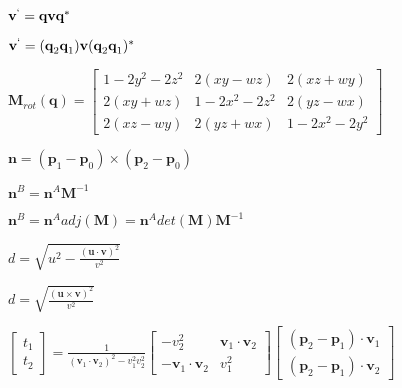 \documentclass{article}
\def\lthtmlcheckvsize{\ifdim\ht\sizebox<\vsize 
  \ifdim\wd\sizebox<\hsize\expandafter\hfill\fi \expandafter\vfill
  \else\expandafter\vss\fi}%
\begin{document}
{\newpage\clearpage
{}%
$ \textbf{v}^\lq = \textbf{q} \textbf{v} \textbf{q}^*$%
\lthtmlindisplaymathZ
\lthtmlcheckvsize\clearpage}

{\newpage\clearpage
{}%
$ \textbf{v}^\lq = (\textbf{q}_2\textbf{q}_1)\textbf{v}(\textbf{q}_2\textbf{q}_1)^*$%
\lthtmlindisplaymathZ
\lthtmlcheckvsize\clearpage}

{\newpage\clearpage
{}%
$ \textbf{M}_{rot}(\textbf{q}) = \begin{bmatrix}
1 - 2y^2 - 2z^2 & 2(xy -wz) & 2(xz + wy) \\
2(xy + wz) & 1 - 2x^2 -2z^2 & 2(yz -wx) \\
2(xz - wy) & 2(yz + wx) & 1 - 2x^2 - 2y^2
\end{bmatrix}
$%
\lthtmlindisplaymathZ
\lthtmlcheckvsize\clearpage}

{\newpage\clearpage
{}%
$ \textbf{n} = (\textbf{p}_1 - \textbf{p}_0) \times (\textbf{p}_2 - \textbf{p}_0)$%
\lthtmlindisplaymathZ
\lthtmlcheckvsize\clearpage}

{\newpage\clearpage
{}%
$ \textbf{n}^B = \textbf{n}^A \textbf{M}^{-1}$%
\lthtmlindisplaymathZ
\lthtmlcheckvsize\clearpage}

{\newpage\clearpage
{}%
$ \textbf{n}^B = \textbf{n}^A adj(\textbf{M}) = \textbf{n}^A det(\textbf{M})\textbf{M}^{-1}$%
\lthtmlindisplaymathZ
\lthtmlcheckvsize\clearpage}

{\newpage\clearpage
{}%
$ d = \sqrt{u^2 - \frac{(\textbf{u} \cdot \textbf{v})^2}{v^2}}$%
\lthtmlindisplaymathZ
\lthtmlcheckvsize\clearpage}

{\newpage\clearpage
{}%
$ d = \sqrt{\frac{(\textbf{u} \times \textbf{v})^2}{v^2}}$%
\lthtmlindisplaymathZ
\lthtmlcheckvsize\clearpage}

{\newpage\clearpage
{}%
$ \begin{bmatrix}t_1 \\t_2 \end{bmatrix} = 
\frac{1}{(\textbf{v}_1 \cdot \textbf{v}_2)^2 - v_1^2 v_2^2}
\begin{bmatrix}-v_2^2 & \textbf{v}_1 \cdot \textbf{v}_2 \\
-\textbf{v}_1 \cdot \textbf{v}_2 & v_1^2\end{bmatrix}
\begin{bmatrix}(\textbf{p}_2 - \textbf{p}_1) \cdot \textbf{v}_1 \\
(\textbf{p}_2 - \textbf{p}_1) \cdot \textbf{v}_2\end{bmatrix}$%
\lthtmlindisplaymathZ
\lthtmlcheckvsize\clearpage}
\end{document}
